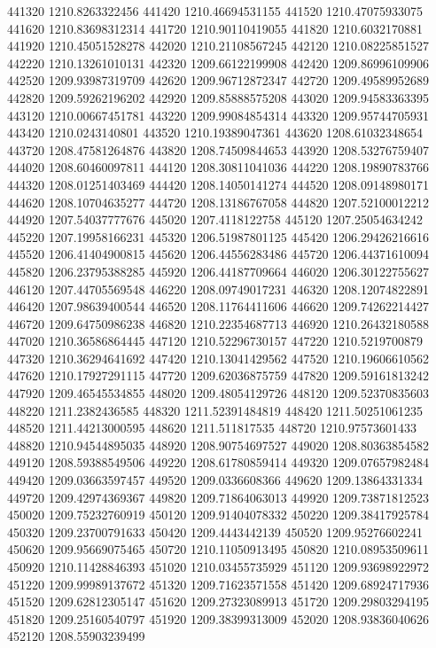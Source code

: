 {441320 1210.8263322456
441420 1210.46694531155
441520 1210.47075933075
441620 1210.83698312314
441720 1210.90110419055
441820 1210.6032170881
441920 1210.45051528278
442020 1210.21108567245
442120 1210.08225851527
442220 1210.13261010131
442320 1209.66122199908
442420 1209.86996109906
442520 1209.93987319709
442620 1209.96712872347
442720 1209.49589952689
442820 1209.59262196202
442920 1209.85888575208
443020 1209.94583363395
443120 1210.00667451781
443220 1209.99084854314
443320 1209.95744705931
443420 1210.0243140801
443520 1210.19389047361
443620 1208.61032348654
443720 1208.47581264876
443820 1208.74509844653
443920 1208.53276759407
444020 1208.60460097811
444120 1208.30811041036
444220 1208.19890783766
444320 1208.01251403469
444420 1208.14050141274
444520 1208.09148980171
444620 1208.10704635277
444720 1208.13186767058
444820 1207.52100012212
444920 1207.54037777676
445020 1207.4118122758
445120 1207.25054634242
445220 1207.19958166231
445320 1206.51987801125
445420 1206.29426216616
445520 1206.41404900815
445620 1206.44556283486
445720 1206.44371610094
445820 1206.23795388285
445920 1206.44187709664
446020 1206.30122755627
446120 1207.44705569548
446220 1208.09749017231
446320 1208.12074822891
446420 1207.98639400544
446520 1208.11764411606
446620 1209.74262214427
446720 1209.64750986238
446820 1210.22354687713
446920 1210.26432180588
447020 1210.36586864445
447120 1210.52296730157
447220 1210.5219700879
447320 1210.36294641692
447420 1210.13041429562
447520 1210.19606610562
447620 1210.17927291115
447720 1209.62036875759
447820 1209.59161813242
447920 1209.46545534855
448020 1209.48054129726
448120 1209.52370835603
448220 1211.2382436585
448320 1211.52391484819
448420 1211.50251061235
448520 1211.44213000595
448620 1211.511817535
448720 1210.97573601433
448820 1210.94544895035
448920 1208.90754697527
449020 1208.80363854582
449120 1208.59388549506
449220 1208.61780859414
449320 1209.07657982484
449420 1209.03663597457
449520 1209.0336608366
449620 1209.13864331334
449720 1209.42974369367
449820 1209.71864063013
449920 1209.73871812523
450020 1209.75232760919
450120 1209.91404078332
450220 1209.38417925784
450320 1209.23700791633
450420 1209.4443442139
450520 1209.95276602241
450620 1209.95669075465
450720 1210.11050913495
450820 1210.08953509611
450920 1210.11428846393
451020 1210.03455735929
451120 1209.93698922972
451220 1209.99989137672
451320 1209.71623571558
451420 1209.68924717936
451520 1209.62812305147
451620 1209.27323089913
451720 1209.29803294195
451820 1209.25160540797
451920 1209.38399313009
452020 1208.93836040626
452120 1208.55903239499
}
